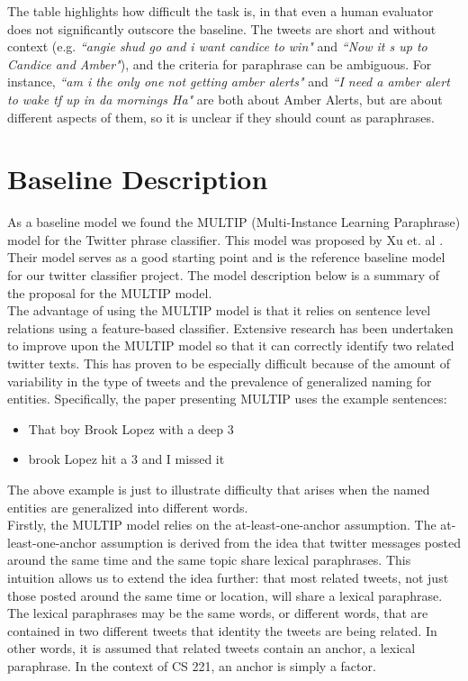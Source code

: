 \documentclass[conference]{IEEEtran}
\begin{document}
The table highlights how difficult the task is, in that even a human evaluator does not significantly outscore the baseline.  The tweets are short and without context (e.g. \emph{``angie shud go and i want candice to win"} and \textit{``Now it s up to Candice and Amber"}), and the criteria for paraphrase can be ambiguous.  For instance, \textit{``am i the only one not getting amber alerts"} and \emph{``I need a amber alert to wake tf up in da mornings Ha"} are both about Amber Alerts, but are about different aspects of them, so it is unclear if they should count as paraphrases.\\

\section{Baseline Description}
As a baseline model we found the MULTIP (Multi-Instance Learning Paraphrase) model for the Twitter phrase classifier. This model was proposed by Xu et. al \cite{zane}. Their model serves as a good starting point and is the reference baseline model for our twitter classifier project. The model description below is a summary of the proposal for the MULTIP model. \\

\indent The advantage of using the MULTIP model is that it relies on sentence level relations using a feature-based classifier. Extensive research has been undertaken to improve upon the MULTIP model so that it can correctly identify two related twitter texts. This has proven to be especially difficult because of the amount of variability in the type of tweets and the prevalence of generalized naming for entities. Specifically, the paper presenting MULTIP uses the example sentences:

\begin{itemize}
\item That boy Brook Lopez with a deep 3
\item brook Lopez hit a 3 and I missed it
\end{itemize}

The above example is just to illustrate difficulty that arises when the named entities are generalized into different words. \\

\indent Firstly, the MULTIP model relies on the at-least-one-anchor assumption. The at-least-one-anchor assumption is derived from the idea that twitter messages posted around the same time and the same topic share lexical paraphrases. This intuition allows us to extend the idea further: that most related tweets, not just those posted around the same time or location, will share a lexical paraphrase. The lexical paraphrases may be the same words, or different words, that are contained in two different tweets that identity the tweets are being related. In other words, it is assumed that related tweets contain an anchor, a lexical paraphrase. In the context of CS 221, an anchor is simply a factor. \\
\end{document}
